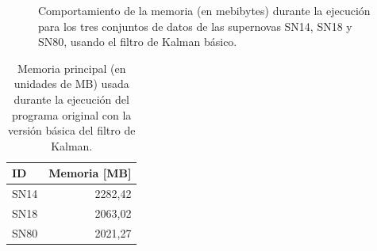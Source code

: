 \begin{figure}[h!]
\centering
{}\hfill
{}\vfill
{}
\caption{Comportamiento de la memoria (en mebibytes) durante la ejecuci\'on para los tres conjuntos de datos  de las supernovas SN14, SN18 y SN80, usando el filtro de Kalman b\'asico.}
\label{fig:mem_kbf}
\end{figure}

 
\begin{table}[h!]
\centering
\caption{Memoria principal (en unidades de MB) usada durante la ejecuci\'on del programa original con la versi\'on b\'asica del filtro de Kalman.}
\begin{tabular}{|l|r|}
\hline
\textbf{ID} & Memoria [MB]\\\hline\hline
SN14 & 2282,42\\\hline
SN18 & 2063,02\\\hline
SN80 & 2021,27\\\hline
\end{tabular}

\label{tab:mem1}
\end{table}


